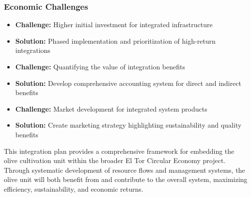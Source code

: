 \subsubsection{Economic Challenges}
\begin{itemize}
    \item \textbf{Challenge:} Higher initial investment for integrated infrastructure
    \item \textbf{Solution:} Phased implementation and prioritization of high-return integrations
    
    \item \textbf{Challenge:} Quantifying the value of integration benefits
    \item \textbf{Solution:} Develop comprehensive accounting system for direct and indirect benefits
    
    \item \textbf{Challenge:} Market development for integrated system products
    \item \textbf{Solution:} Create marketing strategy highlighting sustainability and quality benefits
\end{itemize}

This integration plan provides a comprehensive framework for embedding the olive cultivation unit within the broader El Tor Circular Economy project. Through systematic development of resource flows and management systems, the olive unit will both benefit from and contribute to the overall system, maximizing efficiency, sustainability, and economic returns.


